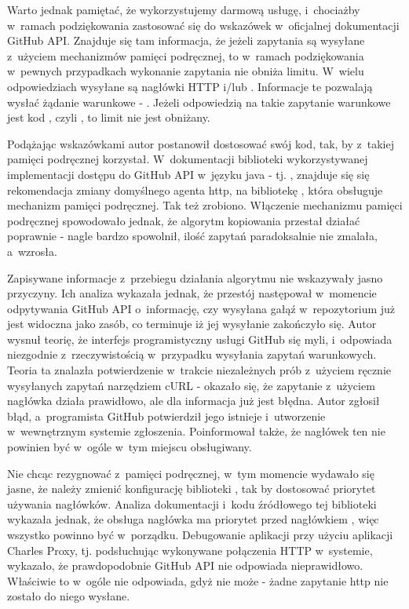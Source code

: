 \medskip
Warto jednak pamiętać, że wykorzystujemy darmową usługę, i~chociażby w~ramach podziękowania zastosować się do wskazówek w~oficjalnej dokumentacji GitHub API. Znajduje się tam informacja, że jeżeli zapytania są wysyłane z~użyciem mechanizmów pamięci podręcznej, to w~ramach podziękowania w~pewnych przypadkach wykonanie zapytania nie obniża limitu. W~wielu odpowiedziach wysyłane są nagłówki HTTP  i/lub . Informacje te pozwalają wysłać żądanie warunkowe - . Jeżeli odpowiedzią na takie zapytanie warunkowe jest kod , czyli , to limit nie jest obniżany.

\medskip
Podążając wskazówkami autor postanowił dostosować swój kod, tak, by z~takiej pamięci podręcznej korzystał. W~dokumentacji biblioteki wykorzystywanej implementacji dostępu do GitHub API w~języku java - tj. , znajduje się się rekomendacja zmiany domyślnego agenta http, na bibliotekę , która obsługuje mechanizm pamięci podręcznej. Tak też zrobiono. Włączenie mechanizmu pamięci podręcznej spowodowało jednak, że algorytm kopiowania przestał działać poprawnie - nagle bardzo spowolnił, ilość zapytań paradoksalnie nie zmalała, a~wzrosła.

\medskip
Zapisywane informacje z~przebiegu działania algorytmu nie wskazywały jasno przyczyny. Ich analiza wykazała jednak, że przestój następował w~momencie odpytywania GitHub API o~informację, czy wysyłana gałąź w~repozytorium już jest widoczna jako zasób, co terminuje iż jej wysyłanie zakończyło się. Autor wysnuł teorię, że interfejs programistyczny usługi GitHub się myli, i~odpowiada niezgodnie z~rzeczywistością w~przypadku wysyłania zapytań warunkowych. Teoria ta znalazła potwierdzenie w~trakcie niezależnych prób z~użyciem ręcznie wysyłanych zapytań narzędziem cURL - okazało się, że zapytanie z~użyciem nagłówka  działa prawidłowo, ale dla  informacja już jest błędna. Autor zgłosił błąd, a~programista GitHub potwierdził jego istnieje i~utworzenie w~wewnętrznym systemie zgłoszenia. Poinformował także, że nagłówek ten nie powinien być w~ogóle w~tym miejscu obsługiwany.

\medskip
Nie chcąc rezygnować z~pamięci podręcznej, w~tym momencie wydawało się jasne, że należy zmienić konfigurację biblioteki , tak by dostosować priorytet używania nagłówków. Analiza dokumentacji i~kodu źródłowego tej biblioteki wykazała jednak, że obsługa nagłówka  ma priorytet przed nagłówkiem , więc wszystko powinno być w~porządku. Debugowanie aplikacji przy użyciu aplikacji Charles Proxy, tj. podsłuchując wykonywane połączenia HTTP w~systemie, wykazało, że prawdopodobnie GitHub API nie odpowiada nieprawidłowo. Właściwie to w~ogóle nie odpowiada, gdyż nie może - żadne zapytanie http nie zostało do niego wysłane.

